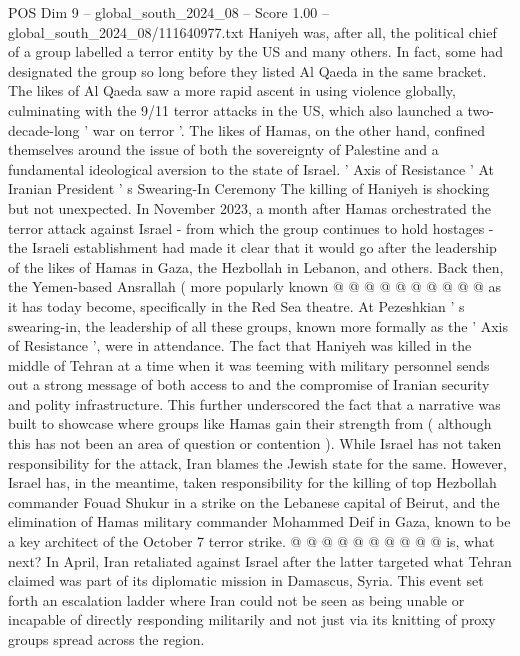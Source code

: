 \begin{textsample}{POS Dim 9 – global\_south\_2024\_08 – Score 1.00 – global\_south\_2024\_08/111640977.txt}  \label{ex:f9_pos_059}
Haniyeh was, after all, the political chief of a group labelled a terror entity by the US and many others.
In fact, some had designated the group so long before they listed Al Qaeda in the same bracket.
The likes of Al Qaeda saw a more rapid ascent in using violence globally, culminating with the 9/11 terror attacks in the US, which also launched a two-decade-long ' war on terror '.
The likes of Hamas, on the other hand, confined themselves around the issue of both the sovereignty of Palestine and a fundamental ideological aversion to the state of Israel. ' Axis of Resistance ' At Iranian President ' s Swearing-In Ceremony The killing of Haniyeh is shocking but not unexpected.
In November 2023, a month after Hamas orchestrated the terror attack against Israel - from which the group continues to hold hostages - the Israeli establishment had made it clear that it would go after the leadership of the likes of Hamas in Gaza, the Hezbollah in Lebanon, and others.
Back then, the Yemen-based Ansrallah ( more popularly known @ @ @ @ @ @ @ @ @ @ as it has today become, specifically in the Red Sea theatre.
At Pezeshkian ' s swearing-in, the leadership of all these groups, known more formally as the ' Axis of Resistance ', were in attendance.
The fact that Haniyeh was killed in the middle of Tehran at a time when it was teeming with military personnel sends out a strong message of both access to and the compromise of Iranian security and polity infrastructure.
This further underscored the fact that a narrative was built to showcase where groups like Hamas gain their strength from ( although this has not been an area of question or contention ).
While Israel has not taken responsibility for the attack, Iran blames the Jewish state for the same.
However, Israel has, in the meantime, taken responsibility for the killing of top Hezbollah commander Fouad Shukur in a strike on the Lebanese capital of Beirut, and the elimination of Hamas military commander Mohammed Deif in Gaza, known to be a key architect of the October 7 terror strike. @ @ @ @ @ @ @ @ @ @ is, what next?
In April, Iran retaliated against Israel after the latter targeted what Tehran claimed was part of its diplomatic mission in Damascus, Syria.
This event set forth an escalation ladder where Iran could not be seen as being unable or incapable of directly responding militarily and not just via its knitting of proxy groups spread across the region.

\end{textsample}
